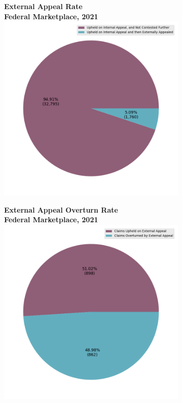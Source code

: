 \documentclass[12pt, a4paper,twoside,parskip=full]{report}
\theoremstyle{plain} %
\theoremstyle{definition} %
\theoremstyle{remark} %
\numberwithin{equation}{chapter}
\begin{document}
		\begin{figure}[h!]
			\centering
			\begin{subfigure}[b]{0.49\textwidth}
				\centering
				\textbf{External Appeal Rate}\\
				\textbf{Federal Marketplace, 2021}\\
				\includegraphics[width=\textwidth]{images/cms_puf/external_appeal_rates_all_insurers.png}
			\end{subfigure}
			\hfill
			\begin{subfigure}[b]{0.49\textwidth}
				\centering
				\textbf{External Appeal Overturn Rate}\\
				\textbf{Federal Marketplace, 2021}\\
				\includegraphics[width=\textwidth]{images/cms_puf/external_appeal_success_rates.png}

\end{subfigure}
\end{figure}
\end{document}
